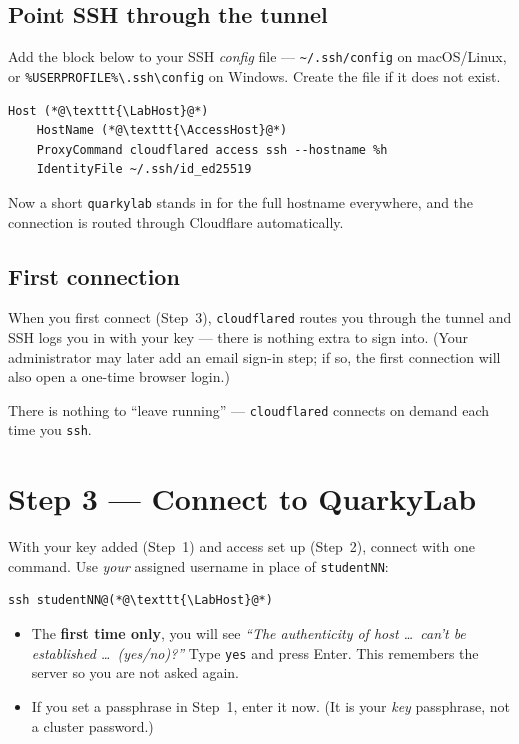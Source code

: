 \documentclass[11pt]{article}
\newcommand{\LabName}{QuarkyLab}                       %
\newcommand{\LabHost}{quarkylab}                       %
\newcommand{\AccessHost}{quarkylab.kylemason.org}      %
\newcommand{\code}[1]{\texttt{#1}}
\begin{document}
\subsection{Point SSH through the tunnel}
Add the block below to your SSH \emph{config} file --- \code{\textasciitilde/.ssh/config} on macOS/Linux, or \code{\%USERPROFILE\%\textbackslash.ssh\textbackslash config} on Windows. Create the file if it does not exist.
\begin{lstlisting}
Host (*@\texttt{\LabHost}@*)
    HostName (*@\texttt{\AccessHost}@*)
    ProxyCommand cloudflared access ssh --hostname %h
    IdentityFile ~/.ssh/id_ed25519
\end{lstlisting}
Now a short \code{\LabHost} stands in for the full hostname everywhere, and the connection is routed through Cloudflare automatically.

\subsection{First connection}
When you first connect (Step~3), \code{cloudflared} routes you through the tunnel and SSH logs you in with your key --- there is nothing extra to sign into. (Your administrator may later add an email sign-in step; if so, the first connection will also open a one-time browser login.)

\begin{tipbox}
There is nothing to ``leave running'' --- \code{cloudflared} connects on demand each time you \code{ssh}.
\end{tipbox}

\section{Step 3 --- Connect to \texorpdfstring{\LabName}{the cluster}}
With your key added (Step~1) and access set up (Step~2), connect with one command. Use \emph{your} assigned username in place of \code{studentNN}:
\begin{lstlisting}
ssh studentNN@(*@\texttt{\LabHost}@*)
\end{lstlisting}

\begin{itemize}
  \item The \textbf{first time only}, you will see \textit{``The authenticity of host \ldots\ can't be established \ldots\ (yes/no)?''} Type \code{yes} and press Enter. This remembers the server so you are not asked again.
  \item If you set a passphrase in Step~1, enter it now. (It is your \emph{key} passphrase, not a cluster password.)
\end{itemize}
\end{document}
